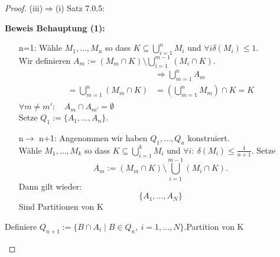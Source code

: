 \begin{proof}{(iii)$\Rightarrow$(i) Satz 7.0.5:}
\begin{itemize}
    \textbf{Beweis Behauptung (1):}
    \begin{itemize}
        \item[n=1:] Wähle $M_1,\dots,M_n$ so dass
        $K \subseteq \bigcup_{i = 1}^{n} M_i$ und $\forall i \delta(M_i) \leq 1$.\\
        Wir definieren $A_m := (M_m \cap K) \setminus \bigcup_{i=1}^{m-1} (M_i \cap K)$.
        \begin{equation*}
        \begin{split}
            &\Rightarrow \bigcup_{m=1}^{n} A_m \\
            = \bigcup_{m=1}^{n} (M_m \cap K) 
            &= \left( \bigcup_{m=1}^{n} M_m \right) \cap K = K\\
        \end{split}
        \end{equation*}
        $\forall m \neq m' : \quad A_m \cap A_{m'} = \emptyset$\\
        Setze $Q_1 := \{A_1,\dots,A_n\}$.
        \item[n$\to$ n+1:] Angenommen wir haben $Q_1,\dots,Q_n$ konstruiert.\\
        Wähle $M_1,\dots,M_k$ so dass
        $K \subseteq \bigcup_{i = 1}^{k} M_i$ und 
        \(\forall i:\ \delta(M_i) \le \frac{1}{n+1}.\)
        Setze $$A_m := (M_m \cap K) \setminus \bigcup_{i=1}^{m-1} (M_i \cap K).$$
        Dann gilt wieder:
        $$
        \{A_1,\dots,A_N\}
        $$
        Sind Partitionen von K
    \end{itemize}
    Definiere $Q_{n+1} := \{ B \cap A_i \mid B \in Q_n,\ i = 1, \ldots, N \}$.Partition von K
\end{itemize}
\end{proof}
